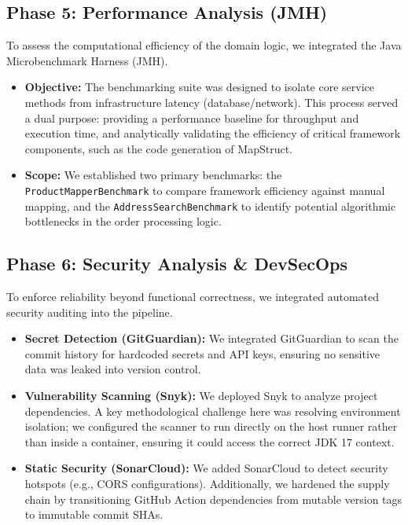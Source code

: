 \subsection{Phase 5: Performance Analysis (JMH)}
To assess the computational efficiency of the domain logic, we integrated the Java Microbenchmark Harness (JMH).
\begin{itemize}
    \item \textbf{Objective:} The benchmarking suite was designed to isolate core service methods from infrastructure latency (database/network). This process served a dual purpose: providing a performance baseline for throughput and execution time, and analytically validating the efficiency of critical framework components, such as the code generation of MapStruct.
    \item \textbf{Scope:} We established two primary benchmarks: the \texttt{ProductMapperBenchmark} to compare framework efficiency against manual mapping, and the \texttt{AddressSearchBenchmark} to identify potential algorithmic bottlenecks in the order processing logic.
\end{itemize}

\subsection{Phase 6: Security Analysis \& DevSecOps}
To enforce reliability beyond functional correctness, we integrated automated security auditing into the pipeline.
\begin{itemize}
    \item \textbf{Secret Detection (GitGuardian):} We integrated GitGuardian to scan the commit history for hardcoded secrets and API keys, ensuring no sensitive data was leaked into version control.
    \item \textbf{Vulnerability Scanning (Snyk):} We deployed Snyk to analyze project dependencies. A key methodological challenge here was resolving environment isolation; we configured the scanner to run directly on the host runner rather than inside a container, ensuring it could access the correct JDK 17 context.
    \item \textbf{Static Security (SonarCloud):} We added SonarCloud to detect security hotspots (e.g., CORS configurations). Additionally, we hardened the supply chain by transitioning GitHub Action dependencies from mutable version tags to immutable commit SHAs.
\end{itemize}